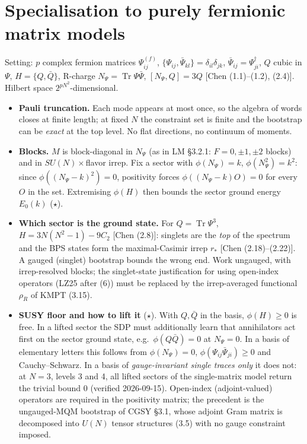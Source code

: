 \documentclass[10pt,a4paper]{article}
\newcommand{\Tr}{\operatorname{Tr}}
\newcommand{\Psib}{\bar\Psi}
\newcommand{\Qb}{\bar Q}
\newcommand{\refnote}[1]{{\small\textcolor{blue!50!black}{[#1]}}}
\begin{document}
\section{Specialisation to purely fermionic matrix models}\label{sec:ferm}
Setting: $p$ complex fermion matrices $\Psi^{(f)}_{ij}$, $\{\Psi_{ij},\Psib_{kl}\}=\delta_{il}\delta_{jk}$, $\Psib_{ij}=\Psi^\dagger_{ji}$, $Q$ cubic in $\Psi$, $H=\{Q,\Qb\}$, R-charge $N_\Psi=\Tr\Psi\Psib$, $[N_\Psi,Q]=3Q$ \refnote{Chen (1.1)--(1.2), (2.4)}. Hilbert space $2^{pN^2}$-dimensional.
\begin{itemize}
\item \textbf{Pauli truncation.} Each mode appears at most once, so the algebra of words closes at finite length; at fixed $N$ the constraint set is finite and the bootstrap can be \emph{exact} at the top level. No flat directions, no continuum of moments.
\item \textbf{Blocks.} $M$ is block-diagonal in $N_\Psi$ (as in LM \S3.2.1: $F=0,\pm1,\pm2$ blocks) and in $SU(N)\times$flavor irrep. Fix a sector with $\phi(N_\Psi)=k$, $\phi(N_\Psi^2)=k^2$: since $\phi((N_\Psi-k)^2)=0$, positivity forces $\phi((N_\Psi-k)O)=0$ for every $O$ in the set. Extremising $\phi(H)$ then bounds the sector ground energy $E_0(k)$ ($\star$).
\item \textbf{Which sector is the ground state.} For $Q=\Tr\Psi^3$, $H=3N(N^2-1)-9\hat C_2$ \refnote{Chen (2.8)}: singlets are the \emph{top} of the spectrum and the BPS states form the maximal-Casimir irrep $r_*$ \refnote{Chen (2.18)--(2.22)}. A gauged (singlet) bootstrap bounds the wrong end. Work ungauged, with irrep-resolved blocks; the singlet-state justification for using open-index operators (LZ25 after (6)) must be replaced by the irrep-averaged functional $\rho_R$ of KMPT (3.15).
\item \textbf{SUSY floor and how to lift it} ($\star$). With $Q,\Qb$ in the basis, $\phi(H)\ge0$ is free. In a lifted sector the SDP must additionally learn that annihilators act first on the sector ground state, e.g.\ $\phi(Q\Qb)=0$ at $N_\Psi=0$. In a basis of elementary letters this follows from $\phi(N_\Psi)=0$, $\phi(\Psi_{ij}\Psib_{ji})\ge0$ and Cauchy--Schwarz. In a basis of \emph{gauge-invariant single traces only} it does not: at $N=3$, levels 3 and 4, all lifted sectors of the single-matrix model return the trivial bound $0$ (verified 2026-09-15). Open-index (adjoint-valued) operators are required in the positivity matrix; the precedent is the ungauged-MQM bootstrap of CGSY \S3.1, whose adjoint Gram matrix is decomposed into $U(N)$ tensor structures (3.5) with no gauge constraint imposed.

\end{itemize}
\end{document}
